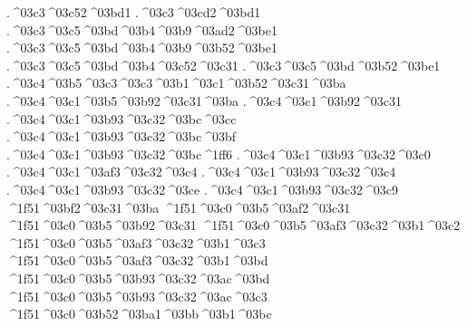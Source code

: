 {.^^^^03c3^^^^03c52^^^^03bd1
.^^^^03c3^^^^03cd2^^^^03bd1	   		%
.^^^^03c3^^^^03c5^^^^03bd^^^^03b4^^^^03b9^^^^03ad2^^^^03be1 		%
.^^^^03c3^^^^03c5^^^^03bd^^^^03b4^^^^03b9^^^^03b52^^^^03be1 		%
.^^^^03c3^^^^03c5^^^^03bd^^^^03b4^^^^03c52^^^^03c31 		%
.^^^^03c3^^^^03c5^^^^03bd^^^^03b52^^^^03be1 		%
.^^^^03c4^^^^03b5^^^^03c3^^^^03c3^^^^03b1^^^^03c1^^^^03b52^^^^03c31^^^^03ba 		%
.^^^^03c4^^^^03c1^^^^03b5^^^^03b92^^^^03c31^^^^03ba 		%
.^^^^03c4^^^^03c1^^^^03b92^^^^03c31
	.^^^^03c4^^^^03c1^^^^03b93^^^^03c32^^^^03bc^^^^03cc 		%
	.^^^^03c4^^^^03c1^^^^03b93^^^^03c32^^^^03bc^^^^03bf
	.^^^^03c4^^^^03c1^^^^03b93^^^^03c32^^^^03bc^^^^1ff6
	.^^^^03c4^^^^03c1^^^^03b93^^^^03c32^^^^03c0 		%
	.^^^^03c4^^^^03c1^^^^03af3^^^^03c32^^^^03c4 		%
	.^^^^03c4^^^^03c1^^^^03b93^^^^03c32^^^^03c4
	.^^^^03c4^^^^03c1^^^^03b93^^^^03c32^^^^03ce 		%
	.^^^^03c4^^^^03c1^^^^03b93^^^^03c32^^^^03c9
^^^^1f51^^^^03bf2^^^^03c31^^^^03ba 		%
^^^^1f51^^^^03c0^^^^03b5^^^^03af2^^^^03c31
^^^^1f51^^^^03c0^^^^03b5^^^^03b92^^^^03c31
	^^^^1f51^^^^03c0^^^^03b5^^^^03af3^^^^03c32^^^^03b1^^^^03c2 		%
	^^^^1f51^^^^03c0^^^^03b5^^^^03af3^^^^03c32^^^^03b1^^^^03c3
	^^^^1f51^^^^03c0^^^^03b5^^^^03af3^^^^03c32^^^^03b1^^^^03bd
	^^^^1f51^^^^03c0^^^^03b5^^^^03b93^^^^03c32^^^^03ac^^^^03bd
	^^^^1f51^^^^03c0^^^^03b5^^^^03b93^^^^03c32^^^^03ac^^^^03c3
^^^^1f51^^^^03c0^^^^03b52^^^^03ba1^^^^03bb^^^^03b1^^^^03bc  		%
}
